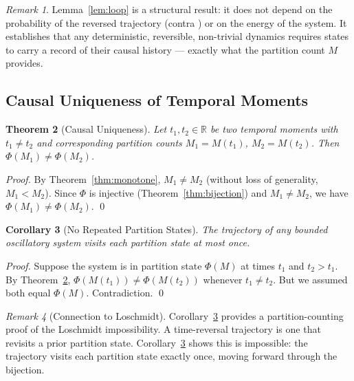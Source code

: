 \documentclass[twocolumn,10pt,a4paper]{article}
\theoremstyle{thmstyle}
\newtheorem{theorem}{Theorem}[section]
\newtheorem{corollary}[theorem]{Corollary}
\theoremstyle{definition}
\theoremstyle{remark}
\newtheorem{remark}[theorem]{Remark}
\newcommand{\R}{\mathbb{R}}
\newcommand{\PhiMap}{\varPhi}
\begin{document}
\begin{remark}
Lemma~\ref{lem:loop} is a structural result: it does not depend on the probability of the reversed trajectory (contra \citealt{boltzmann1877}) or on the energy of the system. It establishes that any deterministic, reversible, non-trivial dynamics requires states to carry a record of their causal history --- exactly what the partition count $M$ provides.
\end{remark}

\subsection{Causal Uniqueness of Temporal Moments}

\begin{theorem}[Causal Uniqueness]
\label{thm:causal-unique}
Let $t_1, t_2 \in \R$ be two temporal moments with $t_1 \neq t_2$ and corresponding partition counts $M_1 = M(t_1)$, $M_2 = M(t_2)$. Then $\PhiMap(M_1) \neq \PhiMap(M_2)$.
\end{theorem}

\begin{proof}
By Theorem~\ref{thm:monotone}, $M_1 \neq M_2$ (without loss of generality, $M_1 < M_2$). Since $\PhiMap$ is injective (Theorem~\ref{thm:bijection}) and $M_1 \neq M_2$, we have $\PhiMap(M_1) \neq \PhiMap(M_2)$. \qed
\end{proof}

\begin{corollary}[No Repeated Partition States]
\label{cor:no-repeat}
The trajectory of any bounded oscillatory system visits each partition state at most once.
\end{corollary}

\begin{proof}
Suppose the system is in partition state $\PhiMap(M)$ at times $t_1$ and $t_2 > t_1$. By Theorem~\ref{thm:causal-unique}, $\PhiMap(M(t_1)) \neq \PhiMap(M(t_2))$ whenever $t_1 \neq t_2$. But we assumed both equal $\PhiMap(M)$. Contradiction. \qed
\end{proof}

\begin{remark}[Connection to Loschmidt]
Corollary~\ref{cor:no-repeat} provides a partition-counting proof of the Loschmidt impossibility. A time-reversal trajectory is one that revisits a prior partition state. Corollary~\ref{cor:no-repeat} shows this is impossible: the trajectory visits each partition state exactly once, moving forward through the bijection.
\end{remark}
\end{document}
